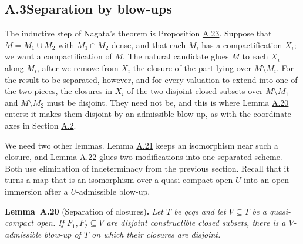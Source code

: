 \documentclass[11pt]{article}
\newenvironment{bpstatement}[2]{\par\addvspace{0.6\baselineskip}\noindent\textbf{#1}#2\textbf{.}\enspace\ignorespaces}
  {\par\addvspace{0.4\baselineskip}}
\newenvironment{bpstatementit}[2]{\begin{bpstatement}{#1}{#2}\itshape\ignorespaces}{\end{bpstatement}}
\begin{document}
\subsection*{\texorpdfstring{A.3\quad Separation by blow-ups}{A.3 Separation by blow-ups}}
\label{bp51}%
\label{bp52}%
The inductive step of Nagata's theorem is Proposition \hyperref[bp61]{A.23}. Suppose that \(M=M_1\cup M_2\) with \(M_1\cap M_2\) dense, and that each \(M_i\) has a compactification \(X_i\); we want a compactification of \(M\). The natural candidate glues \(M\) to each \(X_i\) along \(M_i\), after we remove from \(X_i\) the closure of the part lying over \(M\setminus M_i\). For the result to be separated, however, and for every valuation to extend into one of the two pieces, the closures in \(X_i\) of the two disjoint closed subsets over \(M\setminus M_1\) and \(M\setminus M_2\) must be disjoint. They need not be, and this is where Lemma \hyperref[bp53]{A.20} enters: it makes them disjoint by an admissible blow-up, as with the coordinate axes in Section \hyperref[bp23]{A.2}.

We need two other lemmas. Lemma \hyperref[bp55]{A.21} keeps an isomorphism near such a closure, and Lemma \hyperref[bp58]{A.22} glues two modifications into one separated scheme. Both use elimination of indeterminacy from the previous section. Recall that it turns a map that is an isomorphism over a quasi-compact open \(U\) into an open immersion after a \(U\)-admissible blow-up.

\label{bp53}%
\begin{bpstatementit}{Lemma~A.20}{ (Separation of closures)}
Let \(T\) be qcqs and let \(V\subseteq T\) be a quasi-compact open. If \(F_1,F_2\subseteq V\) are disjoint constructible closed subsets, there is a \(V\)-admissible blow-up of \(T\) on which their closures are disjoint.
\end{bpstatementit}
\end{document}
